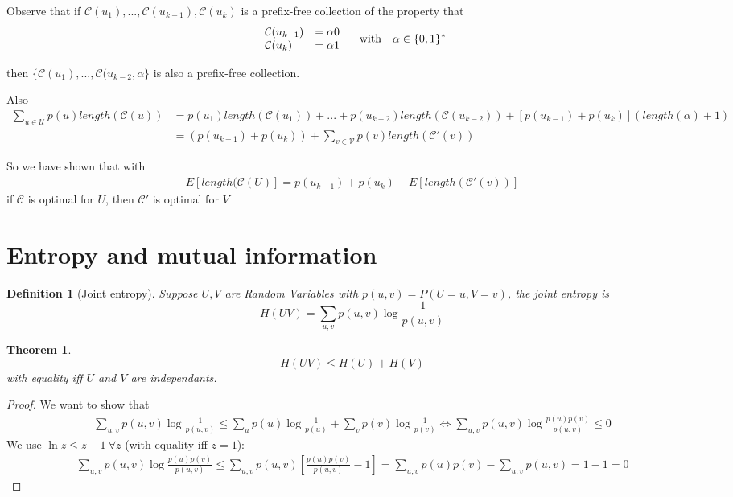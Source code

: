 \documentclass{article}
\newtheorem{theorem}{Theorem}[section]
\newtheorem{definition}{Definition}[section]
\def\V{\mathcal{V}}
\def\U{\mathcal{U}}
\def\C{\mathcal{C}}
\begin{document}
Observe that if $\C(u_1), ... , \C(u_{k-1}), \C(u_k)$ is a prefix-free collection of the property that
\begin{align*}
\left.
\begin{array}{l l}
  \C(u_{k-1}) &= \alpha 0 \\
  \C(u_k)     &= \alpha 1 
\end{array}
\right.
\quad \text{with} \quad \alpha \in \{ 0, 1\}^*
\end{align*}

then $\{\C(u_1), ..., \C(u_{k-2}, \alpha\}$ is also a prefix-free collection.

Also
\begin{align*}
  \sum_{u \in \U} p(u) length(\C(u)) &= p(u_1) length(\C(u_1)) + ... +  p(u_{k-2}) length(\C(u_{k-2}))
  + [p(u_{k-1}) + p(u_k)](length(\alpha) + 1) \\
  &= (p(u_{k-1}) + p(u_k)) + \sum_{v \in \V} p(v) length(\C'(v))
\end{align*}

So we have shown that with
\begin{align*}
  E[length(\C(U)] = p(u_{k-1}) + p(u_k) + E[length(\C'(v))]
\end{align*}
if $\C$ is optimal for $U$, then $\C'$ is optimal for $V$


\section{Entropy and mutual information}
\label{sec:entropy}

\begin{definition}[Joint entropy]
  Suppose $U, V$ are Random Variables with $p(u,v) = P(U=u, V=v)$, the joint entropy is
  \[
    H(UV) = \sum_{u,v} p(u,v) \log \frac 1 {p(u,v)}
  \]
\end{definition}

\begin{theorem}
  \[
    H(UV) \leq H(U) + H(V)
  \]
  with equality iff $U$ and $V$ are independants.
\end{theorem}

\begin{proof}
  We want to show that
  \begin{align*}
    \sum_{u,v} p(u,v) \log \frac 1 {p(u,v)} \leq \sum_u p(u) \log \frac 1 {p(u)} + \sum_v p(v) \log \frac 1 {p(v)}
    \iff \sum_{u,v} p(u,v) \log \frac {p(u)p(v)} {p(u,v)} \leq 0
  \end{align*}
  We use $\ln z \leq z - 1~\forall z$ (with equality iff $z=1$):
  \begin{align*}
    \sum_{u,v} p(u,v) \log \frac {p(u)p(v)} {p(u,v)} \leq \sum_{u,v} p(u,v) \left[ \frac {p(u)p(v)} {p(u, v)} - 1 \right] = \sum_{u,v} p(u)p(v) - \sum_{u,v} p(u,v) = 1 - 1 = 0
  \end{align*}
\end{proof}
\end{document}
